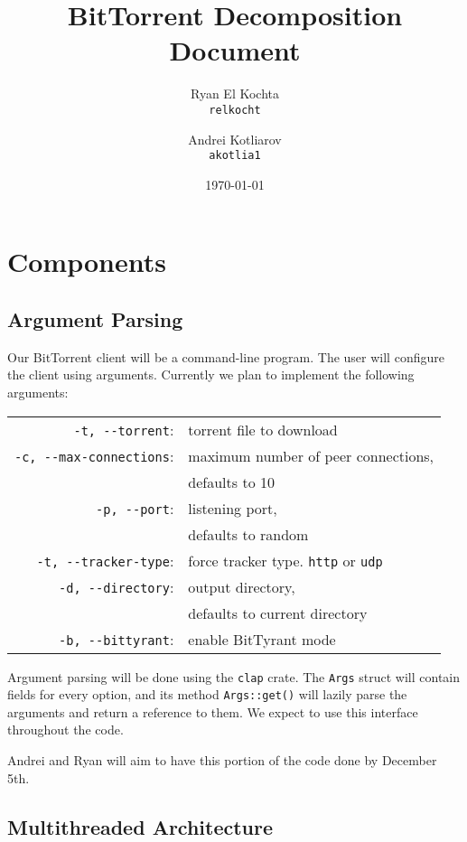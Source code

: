 \documentclass{article}
\title{BitTorrent Decomposition Document}
\author{Ryan El Kochta\\
        \texttt{relkocht}
        \and
        Andrei Kotliarov\\
        \texttt{akotlia1}
        }
\date{\today}
\begin{document}
    \maketitle
    \tableofcontents

    \clearpage
    \section{Components}

    \subsection{Argument Parsing}

    Our BitTorrent client will be a command-line program.
    The user will configure the client using arguments.
    Currently we plan to implement the following arguments:
    \begin{center}
    \begin{tabular}{r l}
        \verb|-t, --torrent|:&         torrent file to download \\
        \verb|-c, --max-connections|:& maximum number of peer connections, \\
        & defaults to 10 \\
        \verb|-p, --port|:&            listening port, \\
        & defaults to random \\
        \verb|-t, --tracker-type|:&    force tracker type. \verb|http| or \verb|udp| \\
        \verb|-d, --directory|:&       output directory, \\
        & defaults to current directory \\
        \verb|-b, --bittyrant|:&       enable BitTyrant mode
    \end{tabular}
    \end{center}
    Argument parsing will be done using the \verb|clap| crate.
    The \verb|Args| struct will contain fields for every option, and its method \verb|Args::get()| will lazily parse the arguments and return a reference to them.
    We expect to use this interface throughout the code.

    Andrei and Ryan will aim to have this portion of the code done by December 5th.

   \subsection{Multithreaded Architecture}
\end{document}
